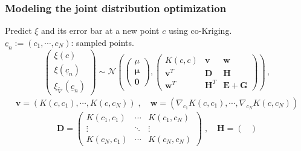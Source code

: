 \documentclass{beamer}
\begin{document}
\begin{frame}
    \frametitle{Modeling the joint distribution \hfill \scriptsize{optimization}} \small
        Predict $\xi$ and its error bar at a new point $c$ using co-Kriging.\\
                $\underline{c}_n := (c_1, \cdots, c_N)$: sampled points.
        \begin{equation*}
            \begin{pmatrix}
                \xi(c) \\ \xi(\underline{c}_n) \\ \xi_{\tilde{\nabla}}(\underline{c}_n)
            \end{pmatrix}
            \sim
            \mathcal{N}\left(
            \begin{pmatrix}
                \mu \\
                \boldsymbol{\mu}\\
                \boldsymbol{0}
            \end{pmatrix} ,
            \begin{pmatrix}
                K(c,c) & \mathbf{v} & \mathbf{w}\\
                \mathbf{v}^T & \mathbf{D} & \mathbf{H}\\
                \mathbf{w}^T & \mathbf{H}^T & \mathbf{E} +{\mathbf{G}}
            \end{pmatrix}
            \right)\,,
            \label{joint dis}
        \end{equation*}
    \scriptsize
    \begin{equation*}\begin{split}
        \mathbf{v} = \left(K(c, c_1), \cdots, K(c,c_N) \right)\;,\quad
        \mathbf{w} = \left(\nabla_{c_1} K(c, c_1),\cdots, \nabla_{c_N} K(c, c_N) \right)
    \end{split}\end{equation*}
    \begin{equation*}
           \mathbf{D}  = \begin{pmatrix}
            K(c_1, c_1) & \cdots & K(c_1, c_N) \\
            \vdots & \ddots & \vdots \\
            K(c_N, c_1) & \cdots & K(c_N, c_N)
        \end{pmatrix}\;,\quad
        \mathbf{H} = \begin{pmatrix}

\end{pmatrix}
\end{equation*}
\end{frame}
\end{document}
